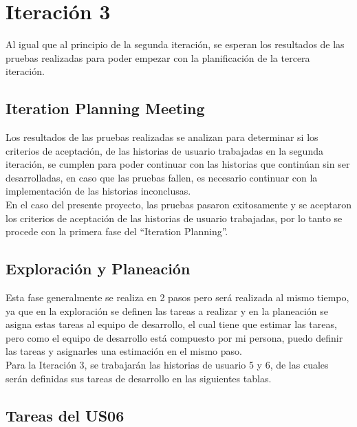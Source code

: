 \section{Iteración 3}
\label{sec:iteracion_3}

Al igual que al principio de la segunda iteración, se esperan los resultados de las pruebas realizadas para poder empezar con la planificación de la tercera iteración.

\subsection{Iteration Planning Meeting}
\label{sub:iteration2_planning_meeting}


Los resultados de las pruebas realizadas se analizan para determinar si los criterios de aceptación, de las historias de usuario trabajadas en la segunda iteración, se cumplen para poder continuar con las historias que continúan sin ser desarrolladas, en caso que las pruebas fallen, es necesario continuar con la implementación de las historias inconclusas.\\

En el caso del presente proyecto, las pruebas pasaron exitosamente y se aceptaron los criterios de aceptación de las historias de usuario trabajadas, por lo tanto se procede con la primera fase del “Iteration Planning”. \\


\subsection{Exploración y Planeación}
\label{sub:iteration2_exploracion_planeacion}

Esta fase generalmente se realiza en 2 pasos pero será realizada al mismo tiempo, ya que en la exploración se definen las tareas a realizar y en la planeación se asigna estas tareas al equipo de desarrollo, el cual tiene que estimar las tareas, pero como el equipo de desarrollo está compuesto por mi persona, puedo definir las tareas y asignarles una estimación en el mismo paso.\\

Para la Iteración 3, se trabajarán las historias de usuario 5 y 6, de las cuales serán definidas sus tareas de desarrollo en las siguientes tablas.


\subsection{Tareas del US06}
\label{sub:us06_tasks}

